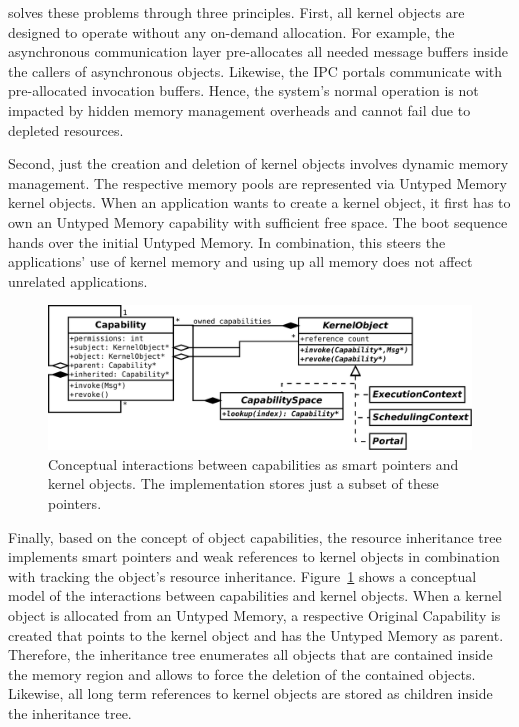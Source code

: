 \mythos solves these problems through three principles. First, all kernel objects are designed to operate without any on-demand allocation. For example, the asynchronous communication layer  pre-allocates all needed message buffers inside the callers of asynchronous objects. Likewise, the IPC portals communicate with pre-allocated invocation buffers. Hence, the system's normal operation is not impacted by hidden memory management overheads and cannot fail due to depleted resources. 

Second, just the creation and deletion of kernel objects involves dynamic memory management. The respective memory pools are represented via Untyped Memory kernel objects. When an application wants to create a kernel object, it first has to own an Untyped Memory capability with sufficient free space.  The boot sequence hands over the initial Untyped Memory. In combination, this steers the applications' use of kernel memory and using up all memory does not affect unrelated applications.

\begin{figure}
  \centering
  \includegraphics[scale=0.25]{fig/capability-model.pdf}
  \caption{Conceptual interactions between capabilities as smart pointers and kernel objects. The implementation stores just a subset of these pointers.}
  \label{fig:capability-model}
\end{figure}

Finally, based on the concept of object capabilities, the resource inheritance tree implements smart pointers and weak references to kernel objects in combination with tracking the object's resource inheritance.  Figure~\ref{fig:capability-model} shows a conceptual model of the interactions between capabilities and kernel objects. When a kernel object is allocated from an Untyped Memory, a respective Original Capability is created that points to the kernel object and has the Untyped Memory as parent. Therefore, the inheritance tree enumerates all objects that are contained inside the memory region and allows to force the deletion of the contained objects. Likewise, all long term references to kernel objects are stored as children inside the inheritance tree.  

